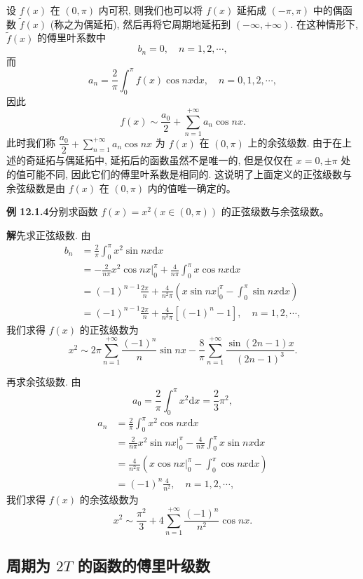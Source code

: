 \documentclass[UTF8,12pt,a4paper,fontset=fandol]{ctexart}
\begin{document}
设 $f(x)$ 在 $(0,\pi)$ 内可积, 则我们也可以将 $f(x)$ 延拓成 $(-\pi,\pi)$ 中的偶函数 $\widetilde f(x)$ (称之为偶延拓), 然后再将它周期地延拓到 $(-\infty,+\infty)$. 在这种情形下, $\widetilde f(x)$ 的傅里叶系数中
\[
  b_n=0,\quad n=1,2,\cdots,
\]
而
\[
  a_n=\frac2\pi\int_0^\pi f(x)\cos nx\mathrm dx,\quad n=0,1,2,\cdots,
\]
因此
\[
  f(x)\sim\frac{a_0}{2}+\sum_{n=1}^{+\infty}a_n\cos nx.
\]
此时我们称 $\dfrac{a_0}{2}+\sum\limits_{n=1}^{+\infty}a_n\cos nx$ 为 $f(x)$ 在 $(0,\pi)$ 上的余弦级数. 由于在上述的奇延拓与偶延拓中, 延拓后的函数虽然不是唯一的, 但是仅仅在 $x=0,\pm\pi$ 处的值可能不同, 因此它们的傅里叶系数是相同的. 这说明了上面定义的正弦级数与余弦级数是由 $f(x)$ 在 $(0,\pi)$ 内的值唯一确定的。

\noindent\textbf{例 12.1.4}\quad 分别求函数 $f(x)=x^2(x\in(0,\pi))$ 的正弦级数与余弦级数。

\noindent\textbf{解}\quad 先求正弦级数. 由
\[
\begin{aligned}
  b_n
  &=\frac2\pi\int_0^\pi x^2\sin nx\mathrm dx\\
  &=-\frac2{n\pi}x^2\cos nx\bigg|_0^\pi
    +\frac4{n\pi}\int_0^\pi x\cos nx\mathrm dx\\
  &=(-1)^{n-1}\frac{2\pi}{n}
    +\frac4{n^2\pi}\left(x\sin nx\bigg|_0^\pi-\int_0^\pi\sin nx\mathrm dx\right)\\
  &=(-1)^{n-1}\frac{2\pi}{n}
    +\frac4{n^3\pi}[(-1)^n-1],\quad n=1,2,\cdots,
\end{aligned}
\]
我们求得 $f(x)$ 的正弦级数为
\[
  x^2\sim
  2\pi\sum_{n=1}^{+\infty}\frac{(-1)^n}{n}\sin nx
  -\frac8\pi\sum_{n=1}^{+\infty}\frac{\sin(2n-1)x}{(2n-1)^3}.
\]

再求余弦级数. 由
\[
  a_0=\frac2\pi\int_0^\pi x^2\mathrm dx=\frac23\pi^2,
\]
\[
\begin{aligned}
  a_n
  &=\frac2\pi\int_0^\pi x^2\cos nx\mathrm dx\\
  &=\frac2{n\pi}x^2\sin nx\bigg|_0^\pi
    -\frac4{n\pi}\int_0^\pi x\sin nx\mathrm dx\\
  &=\frac4{n^2\pi}\left(x\cos nx\bigg|_0^\pi-\int_0^\pi\cos nx\mathrm dx\right)\\
  &=(-1)^n\frac4{n^2},\quad n=1,2,\cdots,
\end{aligned}
\]
我们求得 $f(x)$ 的余弦级数为
\[
  x^2\sim\frac{\pi^2}{3}
  +4\sum_{n=1}^{+\infty}\frac{(-1)^n}{n^2}\cos nx.
\]

\subsection{周期为 $2T$ 的函数的傅里叶级数}
\end{document}
